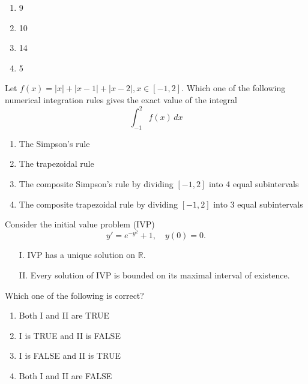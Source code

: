 \begin{enumerate}
    \item 9
    \item 10
    \item 14
    \item 5
\end{enumerate}
\bigskip
\item Let $f(x) = |x| + |x - 1| + |x - 2|, x \in [-1, 2]$. Which one of the following numerical integration rules gives the exact value of the integral
\[
\int_{-1}^2 f(x) \, dx
\]
\begin{enumerate}
    \item The Simpson's rule
    \item The trapezoidal rule
    \item The composite Simpson's rule by dividing $[-1, 2]$ into 4 equal subintervals
    \item The composite trapezoidal rule by dividing $[-1, 2]$ into 3 equal subintervals
\end{enumerate}

\item Consider the initial value problem (IVP)
\[
y' = e^{-y^2} + 1, \quad y(0) = 0.
\]
\begin{enumerate}
    \item[I.] IVP has a unique solution on $\mathbb{R}$.
    \item[II.] Every solution of IVP is bounded on its maximal interval of existence.
\end{enumerate}
Which one of the following is correct?
\begin{enumerate}
    \item Both I and II are TRUE
    \item I is TRUE and II is FALSE
    \item I is FALSE and II is TRUE
    \item Both I and II are FALSE
\end{enumerate}

